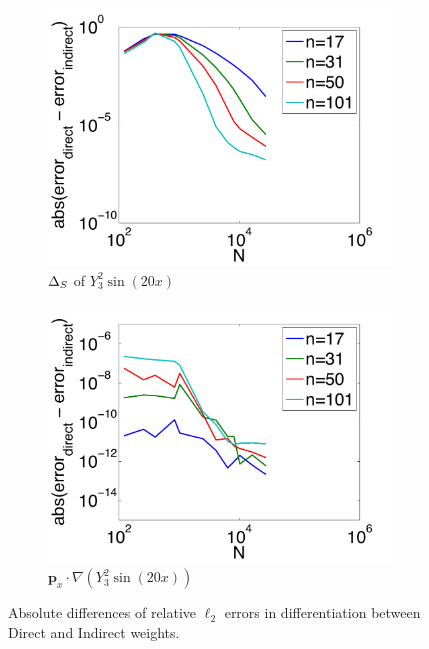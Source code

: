 \begin{figure}[htbp]
	\centering
	\begin{subfigure}[b]{0.425\textwidth}
	\includegraphics[width=1.0\textwidth]{../figures/chapter2/compare_weight_generation/lsfc_vs_px_grad_dot_px_grad/abs_diff_of_rel_l2_errors.pdf}
	\caption{$\LaplaceBeltrami$ of $Y_{3}^{2} \sin(20 x)$}
	\end{subfigure}
	\begin{subfigure}[b]{0.425\textwidth}
	\includegraphics[width=1.0\textwidth]{../figures/chapter2/compare_weight_generation/xsfc_vs_xsfc_alt_on_sph32_times_sine_20x/abs_diff_of_rel_l2_errors.pdf}
	\caption{$\mathbf{p}_{x} \cdot \nabla ( Y_{3}^{2} \sin(20 x))$}
	\end{subfigure}
		\caption{Absolute differences of relative $\ell_{2}$ errors in differentiation between Direct and Indirect weights.}
\end{figure}

